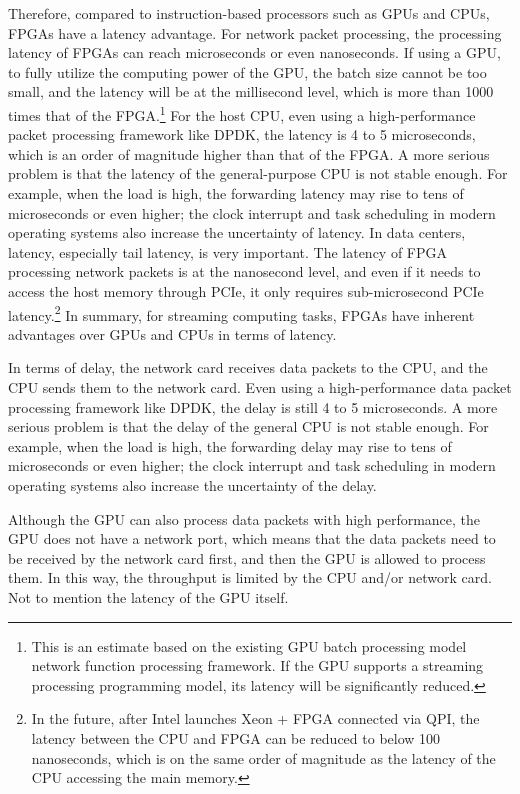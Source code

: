 Therefore, compared to instruction-based processors such as GPUs and CPUs, FPGAs have a latency advantage. For network packet processing, the processing latency of FPGAs can reach microseconds or even nanoseconds. If using a GPU, to fully utilize the computing power of the GPU, the batch size cannot be too small, and the latency will be at the millisecond level, which is more than 1000 times that of the FPGA.\footnote{This is an estimate based on the existing GPU batch processing model network function processing framework. If the GPU supports a streaming processing programming model, its latency will be significantly reduced.} For the host CPU, even using a high-performance packet processing framework like DPDK, the latency is 4 to 5 microseconds, which is an order of magnitude higher than that of the FPGA. A more serious problem is that the latency of the general-purpose CPU is not stable enough. For example, when the load is high, the forwarding latency may rise to tens of microseconds or even higher; the clock interrupt and task scheduling in modern operating systems also increase the uncertainty of latency. In data centers, latency, especially tail latency, is very important. The latency of FPGA processing network packets is at the nanosecond level, and even if it needs to access the host memory through PCIe, it only requires sub-microsecond PCIe latency.\footnote{In the future, after Intel launches Xeon + FPGA connected via QPI, the latency between the CPU and FPGA can be reduced to below 100 nanoseconds, which is on the same order of magnitude as the latency of the CPU accessing the main memory.} In summary, for streaming computing tasks, FPGAs have inherent advantages over GPUs and CPUs in terms of latency.

In terms of delay, the network card receives data packets to the CPU, and the CPU sends them to the network card. Even using a high-performance data packet processing framework like DPDK, the delay is still 4 to 5 microseconds. A more serious problem is that the delay of the general CPU is not stable enough. For example, when the load is high, the forwarding delay may rise to tens of microseconds or even higher; the clock interrupt and task scheduling in modern operating systems also increase the uncertainty of the delay.

Although the GPU can also process data packets with high performance, the GPU does not have a network port, which means that the data packets need to be received by the network card first, and then the GPU is allowed to process them. In this way, the throughput is limited by the CPU and/or network card. Not to mention the latency of the GPU itself.

